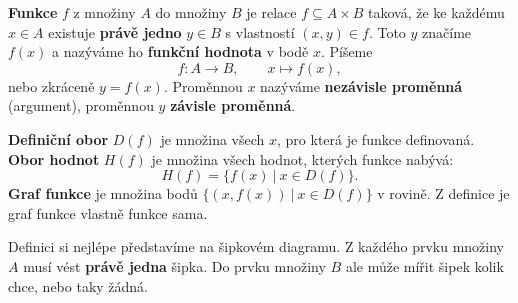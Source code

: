 \begin{definitionbox}
  \textbf{Funkce} $f$ z množiny $A$ do množiny $B$ je relace $f\subseteq A\times B$ taková, že ke každému $x\in A$ existuje \textbf{právě jedno} $y\in B$ s vlastností $(x, y)\in f$. Toto $y$ značíme $f(x)$ a nazýváme ho \textbf{funkční hodnota} v bodě $x$. Píšeme
  \begin{equation*}
    f: A\to B,\qquad x\mapsto f(x),
  \end{equation*}
  nebo zkráceně $y = f(x)$. Proměnnou $x$ nazýváme \textbf{nezávisle proměnná} (argument), proměnnou $y$ \textbf{závisle proměnná}.

  \vspace{0.2cm}

  \textbf{Definiční obor} $D(f)$ je množina všech $x$, pro která je funkce definovaná. \textbf{Obor hodnot} $H(f)$ je množina všech hodnot, kterých funkce nabývá:
  \begin{equation*}
    H(f) = \{f(x)\ |\ x\in D(f)\}.
  \end{equation*}
  \textbf{Graf funkce} je množina bodů $\{(x, f(x))\ |\ x\in D(f)\}$ v rovině. Z definice je graf funkce vlastně funkce sama.
\end{definitionbox}

Definici si nejlépe představíme na šipkovém diagramu. Z každého prvku množiny $A$ musí vést \textbf{právě jedna} šipka. Do prvku množiny $B$ ale může mířit šipek kolik chce, nebo taky žádná.

\begin{center}
\end{center}

